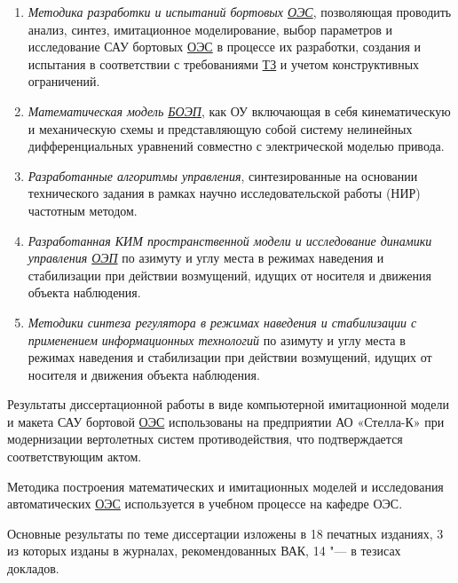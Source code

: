 {}
\begin{enumerate}
  \item \textit{Методика разработки и испытаний бортовых \hyperref[acroEOS]{ОЭС}}, позволяющая проводить анализ, синтез, имитационное моделирование, выбор параметров и исследование САУ бортовых \hyperref[acroEOS]{ОЭС} в процессе их разработки, создания и испытания в соответствии с требованиями  \hyperref[acroTZ]{ТЗ} и учетом конструктивных ограничений. 
  \item \textit{Математическая модель \hyperref[acroAEOS]{БОЭП}}, как ОУ включающая в себя кинематическую и механическую схемы и представляющую собой систему нелинейных дифференциальных уравнений совместно с электрической моделью привода.
  \item \textit{Разработанные алгоритмы управления}, синтезированные на основании технического задания в рамках научно исследовательской работы (НИР) частотным методом.
  \item \textit{Разработанная КИМ пространственной модели и исследование динамики управления  \hyperref[acroEOS]{ОЭП}} по азимуту и углу места в режимах наведения и стабилизации при действии возмущений, идущих от носителя и движения объекта наблюдения.
  \item \textit{Методики синтеза регулятора в режимах наведения и стабилизации с применением информационных технологий} по азимуту и углу места в режимах наведения и стабилизации при действии возмущений, идущих от носителя и движения объекта наблюдения.
\end{enumerate}
\begin{comment}
{\reliability} \todo{полученных результатов обеспечивается Результаты находятся в соответствии с результатами, полученными другими авторами.}
\end{comment}

{\probation}
Результаты диссертационной работы в виде компьютерной имитационной модели и макета САУ бортовой \hyperref[acroEOS]{ОЭС} использованы на предприятии АО «Стелла-К» при модернизации вертолетных систем противодействия, что подтверждается соответствующим актом.

Методика построения математических и имитационных моделей и исследования автоматических  \hyperref[acroEOS]{ОЭС} используется в учебном процессе на кафедре ОЭС.
\begin{comment}
{\contribution} \todo{Автор принимал активное участие} \ldots
\end{comment}

{\publications} Основные результаты по теме диссертации изложены в 18 печатных изданиях,
    3 из которых изданы в журналах, рекомендованных ВАК,
    14 "--- в тезисах докладов.
    
